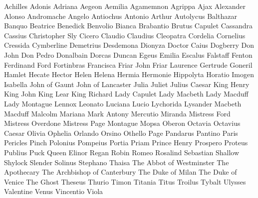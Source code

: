 \documentclass[a0paper,fontscale=0.285]{baposter} %
\begin{document}
\begin{poster}
{
Achilles
Adonis
Adriana
Aegeon
Aemilia
Agamemnon
Agrippa
Ajax
Alexander
Alonso
Andromache
Angelo
Antiochus
Antonio
Arthur
Autolycus
Balthazar
Banquo
Beatrice
Benedick
Benvolio
Bianca
Brabantio
Brutus
Capulet
Cassandra
Cassius
Christopher Sly
Cicero
Claudio
Claudius
Cleopatra
Cordelia
Cornelius
Cressida
Cymberline
Demetrius
Desdemona
Dionyza
Doctor Caius
Dogberry
Don John
Don Pedro
Donalbain
Dorcas
Duncan
Egeus
Emilia
Escalus
Falstaff
Fenton
Ferdinand
Ford
Fortinbras
Francisca
Friar John
Friar Laurence
Gertrude
Goneril
Hamlet
Hecate
Hector
Helen
Helena
Hermia
Hermonie
Hippolyta
Horatio
Imogen
Isabella
John of Gaunt
John of Lancaster
Julia
Juliet
Julius Caesar
King Henry
King John
King Lear
King Richard
Lady Capulet
Lady Macbeth
Lady Macduff
Lady Montague
Lennox
Leonato
Luciana
Lucio
Lychorida
Lysander
Macbeth
Macduff
Malcolm
Mariana
Mark Antony
Mercutio
Miranda
Mistress Ford
Mistress Overdone
Mistress Page
Montague
Mopsa
Oberon
Octavia
Octavius Caesar
Olivia
Ophelia
Orlando
Orsino
Othello
Page
Pandarus
Pantino
Paris
Pericles
Pinch
Polonius
Pompeius
Portia
Priam
Prince Henry
Prospero
Proteus
Publius
Puck
Queen Elinor
Regan
Robin
Romeo
Rosalind
Sebastian
Shallow
Shylock
Slender
Solinus
Stephano
Thaisa
The Abbot of Westminster
The Apothecary
The Archbishop of Canterbury
The Duke of Milan
The Duke of Venice
The Ghost
Theseus
Thurio
Timon
Titania
Titus
Troilus
Tybalt
Ulysses
Valentine
Venus
Vincentio
Viola}




\end{poster}
\end{document}
